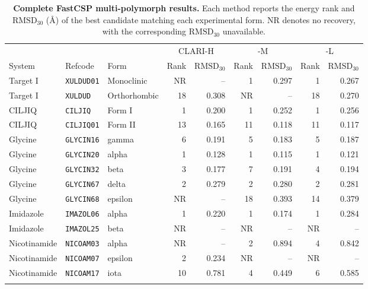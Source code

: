 \begin{table}[H]
\centering
\small
\caption{\textbf{Complete FastCSP multi-polymorph results.}
Each method reports the energy rank and $\mathrm{RMSD}_{30}$ (\AA) of the
best candidate matching each experimental form. NR denotes no recovery, with
the corresponding $\mathrm{RMSD}_{30}$ unavailable.}
\label{tab:fastcsp-multi-ranking-details}

\footnotesize
\setlength{\tabcolsep}{3pt}
\renewcommand{\arraystretch}{1.05}

\begin{tabular}{@{}lllrrrrrr@{}}
\toprule
& & & \multicolumn{2}{c}{CLARI-H}
& \multicolumn{2}{c}{\model{}-M}
& \multicolumn{2}{c}{\model{}-L} \\
\cmidrule(lr){4-5}\cmidrule(lr){6-7}\cmidrule(l){8-9}
System & Refcode & Form
& Rank & $\mathrm{RMSD}_{30}$
& Rank & $\mathrm{RMSD}_{30}$
& Rank & $\mathrm{RMSD}_{30}$ \\
\midrule
Target I & \texttt{XULDUD01} & Monoclinic
& NR & -- & 1 & 0.297 & 1 & 0.267 \\
Target I & \texttt{XULDUD} & Orthorhombic
& 18 & 0.308 & NR & -- & 18 & 0.270 \\
\addlinespace[3pt]

CILJIQ & \texttt{CILJIQ} & Form I
& 1 & 0.200 & 1 & 0.252 & 1 & 0.256 \\
CILJIQ & \texttt{CILJIQ01} & Form II
& 13 & 0.165 & 11 & 0.118 & 11 & 0.117 \\
\addlinespace[3pt]

Glycine & \texttt{GLYCIN16} & gamma
& 6 & 0.191 & 5 & 0.183 & 5 & 0.187 \\
Glycine & \texttt{GLYCIN20} & alpha
& 1 & 0.128 & 1 & 0.115 & 1 & 0.121 \\
Glycine & \texttt{GLYCIN32} & beta
& 3 & 0.177 & 7 & 0.191 & 4 & 0.194 \\
Glycine & \texttt{GLYCIN67} & delta
& 2 & 0.279 & 2 & 0.280 & 2 & 0.281 \\
Glycine & \texttt{GLYCIN68} & epsilon
& NR & -- & 18 & 0.393 & 14 & 0.379 \\
\addlinespace[3pt]

Imidazole & \texttt{IMAZOL06} & alpha
& 1 & 0.220 & 1 & 0.174 & 1 & 0.284 \\
Imidazole & \texttt{IMAZOL25} & beta
& NR & -- & NR & -- & NR & -- \\
\addlinespace[3pt]

Nicotinamide & \texttt{NICOAM03} & alpha
& NR & -- & 2 & 0.894 & 4 & 0.842 \\
Nicotinamide & \texttt{NICOAM07} & epsilon
& 2 & 0.234 & NR & -- & NR & -- \\
Nicotinamide & \texttt{NICOAM17} & iota
& 10 & 0.781 & 4 & 0.449 & 6 & 0.585 \\
\addlinespace[3pt]


\end{tabular}
\end{table}
